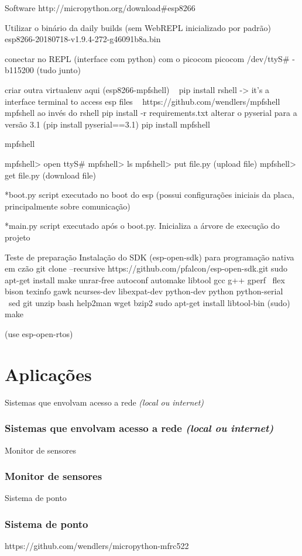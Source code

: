 \documentclass[10pt, compress]{beamer}
\begin{document}
\begin{frame}{Software}
  http://micropython.org/download#esp8266

  Utilizar o binário da daily builds (sem WebREPL inicializado por padrão)
  esp8266-20180718-v1.9.4-272-g46091b8a.bin 

  conectar no REPL (interface com python) com o picocom
  picocom /dev/ttyS# -b115200 (tudo junto)

  criar outra virtualenv aqui (esp8266-mpfshell)
  ~  pip install rshell -> it's a interface terminal to access esp files ~
  https://github.com/wendlers/mpfshell mpfshell ao invés do rshell
  pip install -r requirements.txt
  alterar o pyserial para a versão 3.1 (pip install pyserial==3.1)
  pip install mpfshell


  mpfshell

  mpfshell> open ttyS#
  mpfshell> ls
  mpfshell> put file.py (upload file)
  mpfshell> get file.py (download file)

  *boot.py script executado no boot do esp (possui configurações iniciais da placa, principalmente sobre comunicação)

  *main.py script executado após o boot.py. Inicializa a árvore de execução do projeto

  Teste de preparação Instalação do SDK (esp-open-sdk) para programação nativa em czão
  git clone --recursive https://github.com/pfalcon/esp-open-sdk.git
  sudo apt-get install make unrar-free autoconf automake libtool gcc g++ gperf \
      flex bison texinfo gawk ncurses-dev libexpat-dev python-dev python python-serial \
          sed git unzip bash help2man wget bzip2
  sudo apt-get install libtool-bin
  (sudo) make 

  (use esp-open-rtos)

\end{frame}

\section{Aplicações}

\begin{frame}{Sistemas que envolvam acesso a rede \textit{(local ou internet)}}
  \frametitle{Sistemas que envolvam acesso a rede \textit{(local ou internet)}}
\end{frame}

\begin{frame}{Monitor de sensores}
  \frametitle{Monitor de sensores}
\end{frame}

\begin{frame}{Sistema de ponto}
  \frametitle{Sistema de ponto}
  https://github.com/wendlers/micropython-mfrc522
\end{frame}
\end{document}
